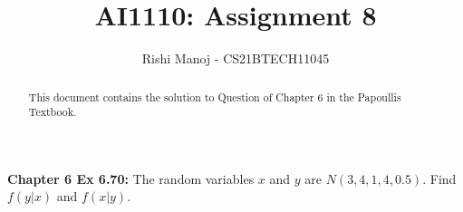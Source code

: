 \documentclass[journal,12pt,twocolumn]{IEEEtran}
\begin{document}
	
	
	\providecommand{\mbf}{\mathbf}
	\providecommand{\pr}[1]{\ensuremath{\Pr\left(#1\right)}}
	\providecommand{\qfunc}[1]{\ensuremath{Q\left(#1\right)}}
	\providecommand{\sbrak}[1]{\ensuremath{{}\left[#1\right]}}
	\providecommand{\lsbrak}[1]{\ensuremath{{}\left[#1\right.}}
	\providecommand{\rsbrak}[1]{\ensuremath{{}\left.#1\right]}}
	\providecommand{\brak}[1]{\ensuremath{\left(#1\right)}}
	\providecommand{\lbrak}[1]{\ensuremath{\left(#1\right.}}
	\providecommand{\rbrak}[1]{\ensuremath{\left.#1\right)}}
	\providecommand{\cbrak}[1]{\ensuremath{\left\{#1\right\}}}
	\providecommand{\lcbrak}[1]{\ensuremath{\left\{#1\right.}}
	\providecommand{\rcbrak}[1]{\ensuremath{\left.#1\right\}}}
	\providecommand{\dec}[2]{\ensuremath{\overset{#1}{\underset{#2}{\gtrless}}}}
	\newcommand{\myvec}[1]{\ensuremath{\begin{pmatrix}#1\end{pmatrix}}}
	\newcommand{\mydet}[1]{\ensuremath{\begin{vmatrix}#1\end{vmatrix}}}
	\newcommand*{\permcomb}[4][0mu]{{{}^{#3}\mkern#1#2_{#4}}}
	\newcommand*{\perm}[1][-3mu]{\permcomb[#1]{P}}
	\newcommand*{\comb}[1][-1mu]{\permcomb[#1]{C}}
		\title{
				AI1110: Assignment 8
		}
		\author{
			Rishi Manoj - CS21BTECH11045
		}
			
	\maketitle
	\begin{abstract}
		This document contains the solution to Question of Chapter 6 in the Papoullis Textbook.
	\end{abstract}
	
	\textbf{Chapter 6 Ex 6.70:}
	The random variables $x$ and $y$ are $N(3,4,1,4,0.5)$. Find $f(y|x)$ and $f(x|y)$.
	
\end{document}

